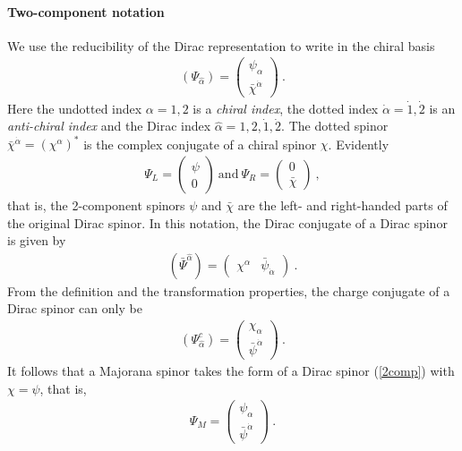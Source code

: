 \documentclass[12pt]{article}
\begin{document}
\paragraph{Two-component notation} We use the reducibility of the Dirac representation to write in the chiral basis
\begin{eqnarray}
\label{2comp}
(\Psi_{\hat \alpha})=\begin{pmatrix} \psi_\alpha \\ \bar \chi^{\dot \alpha}\end{pmatrix}~.
\end{eqnarray}
Here the undotted index $\alpha=1,2$ is a {\em chiral index}, the dotted index $\dot \alpha=\dot 1,\dot 2$ is an {\em anti-chiral index} and the Dirac index $\hat \alpha=1, 2,\dot 1, \dot 2$. The dotted spinor $\bar \chi^{\dot \alpha}=(\chi^{\alpha})^*$ is the complex conjugate of a chiral spinor $\chi$. 
Evidently 
\begin{eqnarray}
\Psi_L=\begin{pmatrix} \psi \\ 0\end{pmatrix}~\mathrm{and}~
\Psi_R=\begin{pmatrix} 0\\ \bar \chi \end{pmatrix}~, 
\end{eqnarray}
that is, the 2-component spinors $\psi$ and $\bar \chi$ are the left- and right-handed parts of the original Dirac spinor. In this notation, the Dirac conjugate of a Dirac spinor is given by 
\begin{eqnarray}
(\bar \Psi^{\hat \alpha})=\begin{pmatrix} \chi^\alpha& \bar \psi_{\dot \alpha}\end{pmatrix}~.
\end{eqnarray}
From the definition and the transformation properties, the charge conjugate of a Dirac spinor can only be
\begin{eqnarray}
(\Psi^c_{\hat \alpha})=\begin{pmatrix} \chi_\alpha\\ \bar \psi^{\dot \alpha}\end{pmatrix}~.
\end{eqnarray}
It follows that a Majorana spinor takes the form of a Dirac spinor (\ref{2comp}) with $\chi=\psi$, that is, 
\begin{eqnarray}
\Psi_M=\begin{pmatrix} \psi_\alpha \\ \bar \psi^{\dot \alpha}\end{pmatrix}~.
\end{eqnarray}
\end{document}
